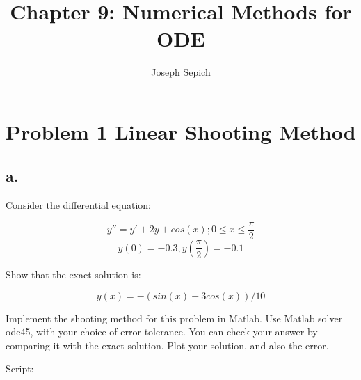 \documentclass[]{article}
\title{Chapter 9: Numerical Methods for ODE}
\subtitle{Joseph Sepich}
\author{}
\date{}
\begin{document}
\maketitle

{
\setcounter{tocdepth}{2}
\tableofcontents
}
\section{Problem 1 Linear Shooting
Method}\label{problem-1-linear-shooting-method}

\subsection{a.}\label{a.}

Consider the differential equation:

\[y'' = y' + 2y + cos(x); 0 \leq x \leq \frac\pi2\]
\[y(0) = -0.3, y(\frac\pi2) = -0.1\]

Show that the exact solution is:

\[y(x) = -(sin(x)+3cos(x))/10\]

Implement the shooting method for this problem in Matlab. Use Matlab
solver ode45, with your choice of error tolerance. You can check your
answer by comparing it with the exact solution. Plot your solution, and
also the error.

Script:
\end{document}
